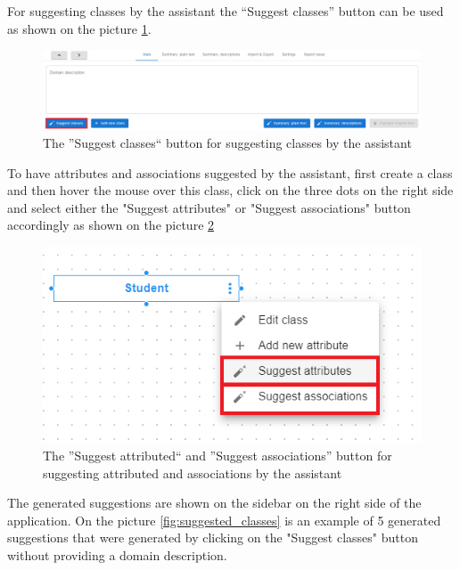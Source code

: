 For suggesting classes by the assistant the ``Suggest classes'' button can be used as shown on the picture \ref{fig:suggest_classes}.

\begin{figure}[!h]
    \includegraphics[scale=0.36]{../docs/images/frontend/suggest-classes.png}
    \caption{\centering The ''Suggest classes`` button for suggesting classes by the assistant}
    \label{fig:suggest_classes}
\end{figure}

To have attributes and associations suggested by the assistant, first create a class and then hover the mouse over this class, click on the three dots on the right side and select either the "Suggest attributes" or "Suggest associations" button accordingly as shown on the picture \ref{fig:suggest_attributes}

\begin{figure}[!h]
    \includegraphics[scale=0.45]{../docs/images/frontend/suggest-attributes.png}
    \caption{\centering The ''Suggest attributed`` and ''Suggest associations'' button for suggesting attributed and associations by the assistant}
    \label{fig:suggest_attributes}
\end{figure}

The generated suggestions are shown on the sidebar on the right side of the application. On the picture \ref{fig:suggested_classes} is an example of 5 generated suggestions that were generated by clicking on the "Suggest classes" button without providing a domain description.

